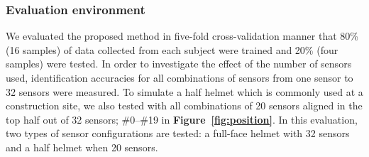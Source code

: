 \documentclass[sigchi,authordraft]{acmart}
\newcommand\figref[1]{\textbf{Figure~\ref{fig:#1}}}
\begin{document}
\subsubsection{Evaluation environment}
We evaluated the proposed method in five-fold cross-validation manner that 80\% (16 samples) of data collected from each subject were trained and 20\% (four samples) were tested. In order to investigate the effect of the number of sensors used, identification accuracies for all combinations of sensors from one sensor to 32 sensors were measured.
To simulate a half helmet which is commonly used at a construction site, we also tested with all combinations of 20 sensors aligned in the top half out of 32 sensors; \#0--\#19 in \figref{position}.
 In this evaluation, two types of sensor configurations are tested: a full-face helmet with 32 sensors and a half helmet when 20 sensors.

\end{document}
